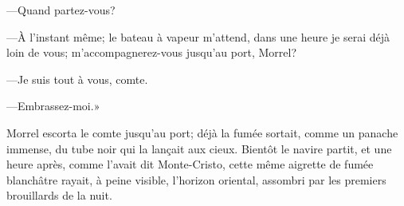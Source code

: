 —Quand partez-vous? 

—À l'instant même; le bateau à vapeur m'attend, dans une heure je serai déjà loin de vous; m'accompagnerez-vous jusqu'au port, Morrel? 

—Je suis tout à vous, comte. 

—Embrassez-moi.» 

Morrel escorta le comte jusqu'au port; déjà la fumée sortait, comme un panache immense, du tube noir qui la lançait aux cieux. Bientôt le navire partit, et une heure après, comme l'avait dit Monte-Cristo, cette même aigrette de fumée blanchâtre rayait, à peine visible, l'horizon oriental, assombri par les premiers brouillards de la nuit. 